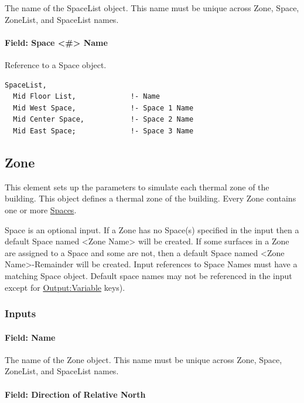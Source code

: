 The name of the SpaceList object. This name must be unique across Zone, Space, ZoneList, and SpaceList names.

\paragraph{Field: Space \textless{}\#\textgreater{} Name}\label{field-space-name}

Reference to a Space object.

\begin{lstlisting}
SpaceList,
  Mid Floor List,             !- Name
  Mid West Space,             !- Space 1 Name
  Mid Center Space,           !- Space 2 Name
  Mid East Space;             !- Space 3 Name
\end{lstlisting}


\subsection{Zone}\label{zone}

This element sets up the parameters to simulate each thermal zone of the building.
This object defines a thermal zone of the building. Every Zone contains one or more \hyperref[space]{Spaces}.

Space is an optional input. If a Zone has no Space(s) specified in the input then a default Space named \textless{}Zone Name\textgreater{} will be created.
If some surfaces in a Zone are assigned to a Space and some are not, then a default Space
named \textless{}Zone Name\textgreater{}-Remainder will be created.
Input references to Space Names must have a matching Space object.
Default space names may not be referenced in the input except for \hyperref[outputvariable]{Output:Variable} keys).

\subsubsection{Inputs}\label{inputs-048}

\paragraph{Field: Name}\label{zone-object-name}

The name of the Zone object. This name must be unique across Zone, Space, ZoneList, and SpaceList names.

\paragraph{Field: Direction of Relative North}\label{field-direction-of-relative-north}

